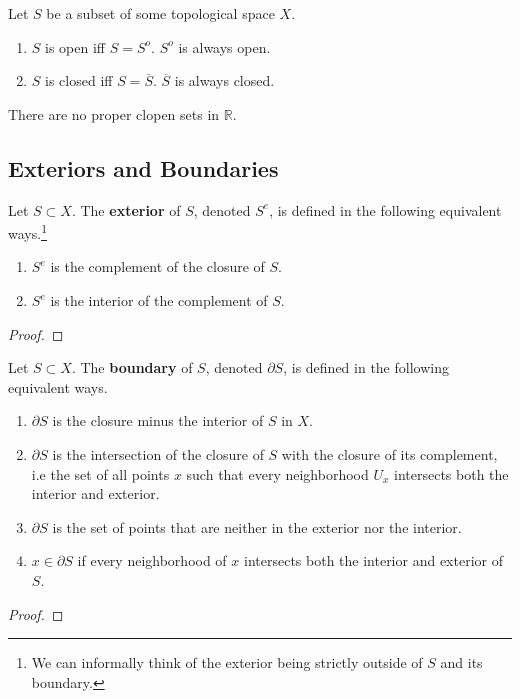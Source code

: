   \begin{lemma}
    Let $S$ be a subset of some topological space $X$. 
    \begin{enumerate}
      \item $S$ is open iff $S = S^{o}$. $S^{o}$ is always open.
      \item $S$ is closed iff $S = \overline{S}$. $\overline{S}$ is always closed. 
    \end{enumerate}
  \end{lemma}

  \begin{theorem}
    There are no proper clopen sets in $\mathbb{R}$. 
  \end{theorem}

\subsection{Exteriors and Boundaries}

  \begin{definition}[Exteriors]
    Let $S \subset X$. The \textbf{exterior} of $S$, denoted $S^e$, is defined in the following equivalent ways.\footnote{We can informally think of the exterior being strictly outside of $S$ and its boundary.}
    \begin{enumerate}
      \item $S^e$ is the complement of the closure of $S$. 
      \item $S^e$ is the interior of the complement of $S$. 
    \end{enumerate}
  \end{definition}
  \begin{proof}
    
  \end{proof}

  \begin{definition}[Boundary]
    Let $S \subset X$. The \textbf{boundary} of $S$, denoted $\partial S$, is defined in the following equivalent ways. 
    \begin{enumerate}
      \item $\partial S$ is the closure minus the interior of $S$ in $X$. 
      \item $\partial S$ is the intersection of the closure of $S$ with the closure of its complement, i.e the set of all points $x$ such that every neighborhood $U_x$ intersects both the interior and exterior. 
      \item $\partial S$ is the set of points that are neither in the exterior nor the interior. 
      \item $x \in \partial S$ if every neighborhood of $x$ intersects both the interior and exterior of $S$. 
    \end{enumerate}
  \end{definition}
  \begin{proof}
    
  \end{proof}


